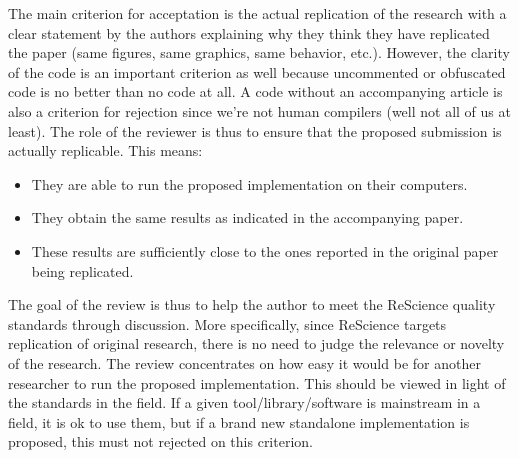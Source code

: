 \documentclass[a4paper,10pt, twocolumn]{article}
\begin{document}
The main criterion for acceptation is the actual replication of the research
with a clear statement by the authors explaining why they think they have
replicated the paper (same figures, same graphics, same behavior,
etc.). However, the clarity of the code is an important criterion as well because
uncommented or obfuscated code is no better than no code at all. A code without an
accompanying article is also a criterion for rejection since we’re not human
compilers (well not all of us at least). The role of the reviewer is thus to
ensure that the proposed submission is actually replicable. This means:
%
\begin{itemize}
\item They are able to run the proposed implementation on their computers.
\item They obtain the same results as indicated in the accompanying paper.
\item These results are sufficiently close to the ones reported in the original paper being replicated.
\end{itemize}
%
The goal of the review is thus to help the author to meet the ReScience quality
standards through discussion. More specifically, since ReScience targets
replication of original research, there is no need to judge the relevance or
novelty of the research. The review concentrates on how easy it would be for
another researcher to run the proposed implementation. This should be viewed in
light of the standards in the field. If a given tool/library/software is
mainstream in a field, it is ok to use them, but if a brand new standalone
implementation is proposed, this must not rejected on this criterion.


\end{document}
